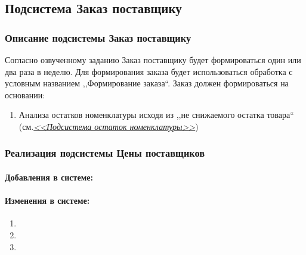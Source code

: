 \subsection{Подсистема Заказ поставщику}
\subsubsection{Описание подсистемы Заказ поставщику}
Согласно озвученному  заданию Заказ поставщику будет формироваться один или два раза в неделю. Для формирования заказа будет использоваться обработка с условным названием ,,Формирование заказа``. Заказ должен формироваться на основании:
\begin{enumerate}	
	\item Анализа остатков номенклатуры исходя из ,,не снижаемого остатка товара``  (см.\hyperlink{3_1}{\textit {<<Подсистема остаток номенклатуры>>}})
\end{enumerate}
\subsubsection{Реализация подсистемы Цены поставщиков}
\paragraph{Добавления в системе:}
\paragraph{Изменения в системе:}
\begin{enumerate}	
	\item 
	\item 
	\item 
\end{enumerate}